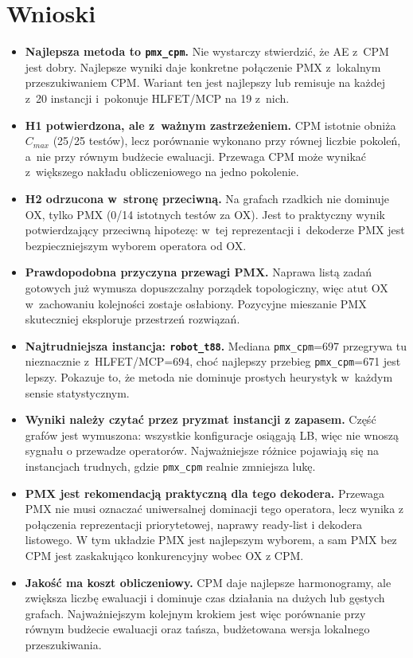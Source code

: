 \documentclass[12pt,a4paper]{article}
\begin{document}
\section{Wnioski}
\label{sec:wnioski}
\begin{itemize}[itemsep=3pt, topsep=3pt]
    \item \textbf{Najlepsza metoda to \texttt{pmx\_cpm}.} Nie wystarczy stwierdzić, że AE z~CPM jest
    dobry. Najlepsze wyniki daje konkretne połączenie PMX z~lokalnym przeszukiwaniem CPM. Wariant ten
    jest najlepszy lub remisuje na każdej z~20 instancji i~pokonuje HLFET/MCP na 19 z~nich.
    \item \textbf{H1 potwierdzona, ale z~ważnym zastrzeżeniem.} CPM istotnie obniża $C_{max}$
    (25/25 testów), lecz porównanie wykonano przy równej liczbie pokoleń, a~nie przy równym budżecie
    ewaluacji. Przewaga CPM może wynikać z~większego nakładu obliczeniowego na jedno pokolenie.
    \item \textbf{H2 odrzucona w~stronę przeciwną.} Na grafach rzadkich nie dominuje OX, tylko PMX
    (0/14 istotnych testów za OX). Jest to praktyczny wynik potwierdzający przeciwną hipotezę:
    w~tej reprezentacji i~dekoderze PMX jest bezpieczniejszym wyborem operatora od OX.
    \item \textbf{Prawdopodobna przyczyna przewagi PMX.} Naprawa listą zadań gotowych już wymusza
    dopuszczalny porządek topologiczny, więc atut OX w~zachowaniu kolejności zostaje osłabiony.
    Pozycyjne mieszanie PMX skuteczniej eksploruje przestrzeń rozwiązań.
    \item \textbf{Najtrudniejsza instancja: \texttt{robot\_t88}.} Mediana \texttt{pmx\_cpm}=697
    przegrywa tu nieznacznie z~HLFET/MCP=694, choć najlepszy przebieg \texttt{pmx\_cpm}=671 jest lepszy.
    Pokazuje to, że metoda nie dominuje prostych heurystyk w~każdym sensie statystycznym.
    \item \textbf{Wyniki należy czytać przez pryzmat instancji z zapasem.} Część grafów jest wymuszona:
    wszystkie konfiguracje osiągają LB, więc nie wnoszą sygnału o przewadze operatorów. Najważniejsze
    różnice pojawiają się na instancjach trudnych, gdzie \texttt{pmx\_cpm} realnie zmniejsza lukę.
    \item \textbf{PMX jest rekomendacją praktyczną dla tego dekodera.} Przewaga PMX nie musi oznaczać
    uniwersalnej dominacji tego operatora, lecz wynika z połączenia reprezentacji priorytetowej,
    naprawy ready-list i dekodera listowego. W tym układzie PMX jest najlepszym wyborem, a sam PMX
    bez CPM jest zaskakująco konkurencyjny wobec OX z CPM.
    \item \textbf{Jakość ma koszt obliczeniowy.} CPM daje najlepsze harmonogramy, ale zwiększa liczbę
    ewaluacji i dominuje czas działania na dużych lub gęstych grafach. Najważniejszym kolejnym krokiem
    jest więc porównanie przy równym budżecie ewaluacji oraz tańsza, budżetowana wersja lokalnego
    przeszukiwania.
\end{itemize}
\end{document}
